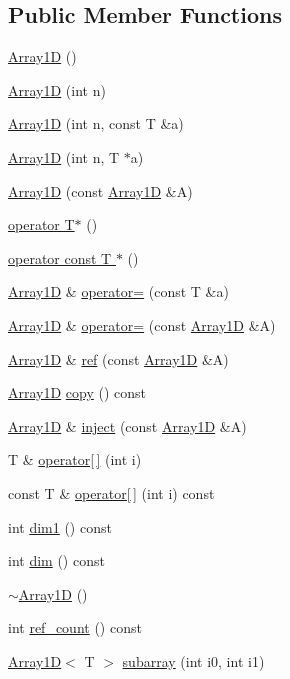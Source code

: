\subsection*{Public Member Functions}
\begin{DoxyCompactItemize}
\item 
\hyperlink{classTNT_1_1Array1D_a63efd23cd38d37d427702d5e1d2b23d3}{Array1D} ()
\item 
\hyperlink{classTNT_1_1Array1D_a97139e0062704ec12f76c51a4f8527f1}{Array1D} (int n)
\item 
\hyperlink{classTNT_1_1Array1D_adfcc1fa364923b4fccc20b5e2df39902}{Array1D} (int n, const T \&a)
\item 
\hyperlink{classTNT_1_1Array1D_a1db0c6d3a77baacb01cd6fd89e86f342}{Array1D} (int n, T $\ast$a)
\item 
\hyperlink{classTNT_1_1Array1D_a9d1bf5c40c8d7a591d20134ff5561817}{Array1D} (const \hyperlink{classTNT_1_1Array1D}{Array1D} \&A)
\item 
\hyperlink{classTNT_1_1Array1D_a0e2f6065b8e549e4138937417117f067}{operator T$\ast$} ()
\item 
\hyperlink{classTNT_1_1Array1D_a6092726d1cea6451128467064a2c31cb}{operator const T $\ast$} ()
\item 
\hyperlink{classTNT_1_1Array1D}{Array1D} \& \hyperlink{classTNT_1_1Array1D_aaf1264253a6e721f065287a7a2405764}{operator=} (const T \&a)
\item 
\hyperlink{classTNT_1_1Array1D}{Array1D} \& \hyperlink{classTNT_1_1Array1D_afa653e3563d08d4abc0a6f186e561b0e}{operator=} (const \hyperlink{classTNT_1_1Array1D}{Array1D} \&A)
\item 
\hyperlink{classTNT_1_1Array1D}{Array1D} \& \hyperlink{classTNT_1_1Array1D_a908c5381a74bcb1f50d47b37327265ae}{ref} (const \hyperlink{classTNT_1_1Array1D}{Array1D} \&A)
\item 
\hyperlink{classTNT_1_1Array1D}{Array1D} \hyperlink{classTNT_1_1Array1D_aa9e24ae360ffeb864304fd58399515c8}{copy} () const
\item 
\hyperlink{classTNT_1_1Array1D}{Array1D} \& \hyperlink{classTNT_1_1Array1D_a214990ddf4bcb1541bcd18cbfdeb0b25}{inject} (const \hyperlink{classTNT_1_1Array1D}{Array1D} \&A)
\item 
T \& \hyperlink{classTNT_1_1Array1D_a16850fa648cd1bf8144df68e1418b3ee}{operator\mbox{[}$\,$\mbox{]}} (int i)
\item 
const T \& \hyperlink{classTNT_1_1Array1D_a774027e05012d66f5cd9d2aae57d7ab4}{operator\mbox{[}$\,$\mbox{]}} (int i) const
\item 
int \hyperlink{classTNT_1_1Array1D_a0520ceb2c7ec7739034d441cbef00253}{dim1} () const
\item 
int \hyperlink{classTNT_1_1Array1D_a1d2fb4661112c951c792e91bf0d357a0}{dim} () const
\item 
\hyperlink{classTNT_1_1Array1D_a3d293188a2c4d0dad2075c747a1560c4}{$\sim$\+Array1D} ()
\item 
int \hyperlink{classTNT_1_1Array1D_a359ce42de82885374ef0468e7ab14389}{ref\+\_\+count} () const
\item 
\hyperlink{classTNT_1_1Array1D}{Array1D}$<$ T $>$ \hyperlink{classTNT_1_1Array1D_a47447dc28a1956e5018953f806192330}{subarray} (int i0, int i1)
\end{DoxyCompactItemize}
